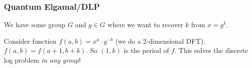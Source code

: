 \subsubsection{Quantum Elgamal/DLP}
We have some group $G$ and $g\in G$ where we want to recover $k$ from $x=g^k$.

Consider function $f(a, b) = x^a \cdot g^{-b}$ (we do a 2-dimensional DFT). $f(a, b) = f(a+1, b+k)$. So $(1, k)$ is the period of $f$. This solves the discrete log problem \emph{in any group}!